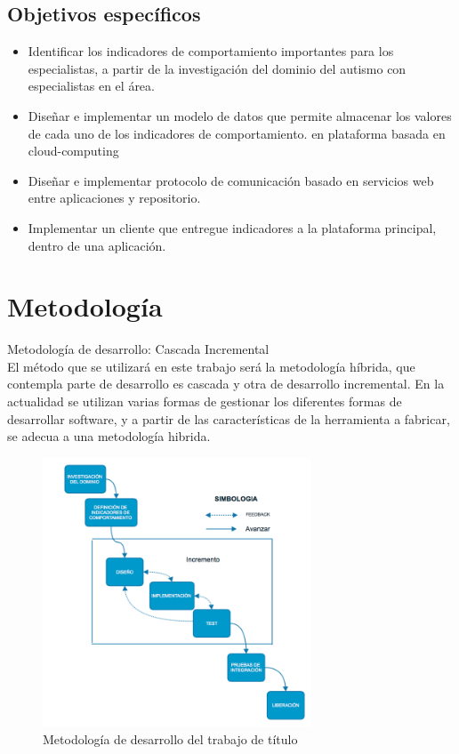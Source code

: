 \documentclass[12pt,letterpaper]{article}
\begin{document}
\subsection{Objetivos espec\'ificos}

\begin{itemize}
    \item Identificar los indicadores de comportamiento importantes para los especialistas, 
    a partir de la investigaci\'on del dominio del autismo con especialistas en el \'area.   
    
    \item Dise\~nar e implementar  un modelo de datos que permite almacenar los valores 
    de cada uno de los indicadores de comportamiento. en plataforma basada en cloud-computing
    
    \item Dise\~nar e implementar protocolo de comunicaci\'on basado en servicios web 
    entre aplicaciones y repositorio.
    
    \item Implementar un cliente que entregue indicadores a la plataforma principal, 
    dentro de una aplicaci\'on.
    
\end{itemize}




\section{Metodolog\'ia}
\label{metod}


Metodolog\'ia de desarrollo: Cascada Incremental \\
El m\'etodo que se utilizar\'a en este trabajo ser\'a la metodolog\'ia h\'ibrida, 
que contempla parte de desarrollo es cascada y otra de desarrollo incremental. 
En la actualidad se utilizan varias formas de gestionar los diferentes formas 
de desarrollar software, y a partir de las caracter\'isticas de la herramienta a 
fabricar, se adecua a una metodolog\'ia hibrida.



\begin{figure}[htb]
\begin{center}
\includegraphics[width=8cm]{metodologia.png}
\end{center}
\caption{Metodolog\'ia de desarrollo del trabajo de t\'itulo}
\end{figure}
\end{document}
